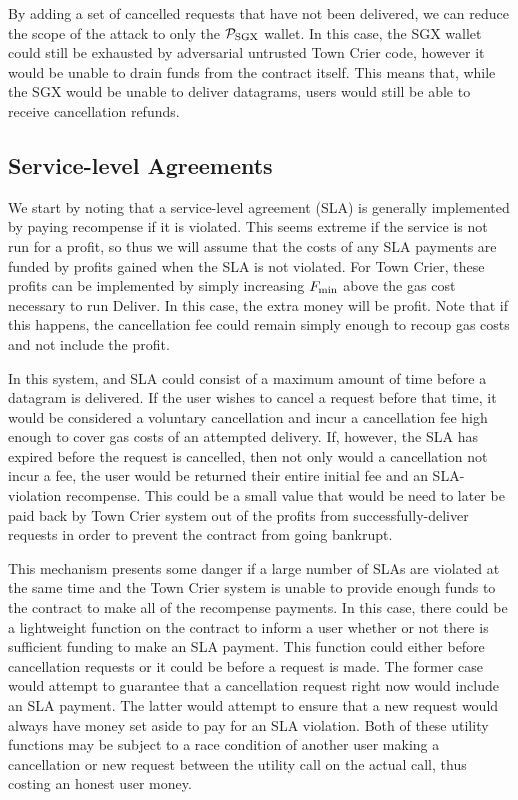 By adding a set of cancelled requests that have not been delivered, we can reduce the scope of the attack to only the $\mathcal{P}_{\rm SGX}$ wallet.
In this case, the SGX wallet could still be exhausted by adversarial untrusted Town Crier code, however it would be unable to drain funds from the contract itself.
This means that, while the SGX would be unable to deliver datagrams, users would still be able to receive cancellation refunds.


\subsection{Service-level Agreements}

We start by noting that a service-level agreement (SLA) is generally implemented by paying recompense if it is violated.
This seems extreme if the service is not run for a profit, so thus we will assume that the costs of any SLA payments are funded by profits gained when the SLA is not violated.
For Town Crier, these profits can be implemented by simply increasing $F_{\rm min}$ above the gas cost necessary to run Deliver.
In this case, the extra money will be profit.
Note that if this happens, the cancellation fee could remain simply enough to recoup gas costs and not include the profit.

In this system, and SLA could consist of a maximum amount of time before a datagram is delivered.
If the user wishes to cancel a request before that time, it would be considered a voluntary cancellation and incur a cancellation fee high enough to cover gas costs of an attempted delivery.
If, however, the SLA has expired before the request is cancelled, then not only would a cancellation not incur a fee, the user would be returned their entire initial fee and an SLA-violation recompense.
This could be a small value that would be need to later be paid back by Town Crier system out of the profits from successfully-deliver requests in order to prevent the contract from going bankrupt.

This mechanism presents some danger if a large number of SLAs are violated at the same time and the Town Crier system is unable to provide enough funds to the contract to make all of the recompense payments.
In this case, there could be a lightweight function on the contract to inform a user whether or not there is sufficient funding to make an SLA payment.
This function could either before cancellation requests or it could be before a request is made.
The former case would attempt to guarantee that a cancellation request right now would include an SLA payment.
The latter would attempt to ensure that a new request would always have money set aside to pay for an SLA violation.
Both of these utility functions may be subject to a race condition of another user making a cancellation or new request between the utility call on the actual call, thus costing an honest user money.






